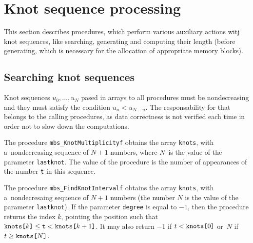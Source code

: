 

\newpage
\section{Knot sequence processing}

This section describes procedures, which perform various auxiliary
actions witj knot sequences, like searching, generating and computing
their length (before generating, which is necessary for the allocation
of appropriate memory blocks).

\subsection{Searching knot sequences}

Knot sequences $u_0,\ldots,u_N$ pased in arrays to all procedures must be
nondecreasing and they must satisfy the condition $u_n<u_{N-n}$.
The responsability for that belongs to the calling procedures,
as data correctness is not verified each time in order not to
slow down the computations.

\vspace{\bigskipamount}
The procedure \texttt{mbs\_KnotMultiplicityf} obtains the array
\texttt{knots}, with a~nondecreasing sequence of $N+1$ numbers,
where $N$~is the value of the parameter \texttt{lastknot}.
The value of the procedure is the number of appearances of the
number \texttt{t} in this sequence.

\vspace{\bigskipamount}
\begin{sloppypar}
The procedure \texttt{mbs\_FindKnotIntervalf} obtains the array \texttt{knots},
with a~nondecresaing sequence of $N+1$ numbers (the number $N$ is the value
of the parameter \texttt{lastknot}). If the parameter \texttt{degree} is equal to
$-1$, then the procedure returns the index $k$, pointing the position
such that
$\mbox{\texttt{knots[$k$]}}\leq\mbox{\texttt{t}}<\mbox{\texttt{knots[$k+1$]}}$.
It may also return $-1$ if $t<\mbox{\texttt{knots[$0$]}}$ or~$N$
if $t\geq\mbox{\texttt{knots[$N$]}}$.
\end{sloppypar}

